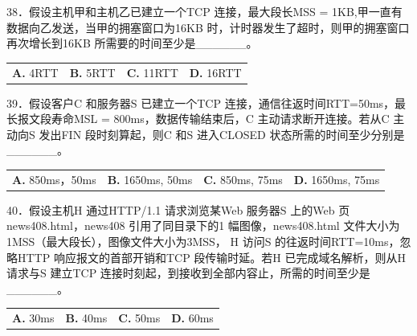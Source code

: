\documentclass[UTF8,11pt]{ctexart}
\begin{document}
38．假设主机甲和主机乙已建立一个TCP 连接，最大段长MSS = 1KB,甲一直有数据向乙发送，当甲的拥塞窗口为16KB 时，计时器发生了超时，则甲的拥塞窗口再次增长到16KB 所需要的时间至少是\_\_\_\_\_\_。


\begin{center}\begin{tabular}{>{\raggedright\arraybackslash}p{\dimexpr(\linewidth-8\tabcolsep)/4\relax}>{\raggedright\arraybackslash}p{\dimexpr(\linewidth-8\tabcolsep)/4\relax}>{\raggedright\arraybackslash}p{\dimexpr(\linewidth-8\tabcolsep)/4\relax}>{\raggedright\arraybackslash}p{\dimexpr(\linewidth-8\tabcolsep)/4\relax}}
\textbf{A.} 4RTT & \textbf{B.} 5RTT & \textbf{C.} 11RTT & \textbf{D.} 16RTT\\[.35em]\end{tabular}\end{center}

39．假设客户C 和服务器S 已建立一个TCP 连接，通信往返时间RTT=50ms，最长报文段寿命MSL = 800ms，数据传输结束后，C 主动请求断开连接。若从C 主动向S 发出FIN 段时刻算起，则C 和S 进入CLOSED 状态所需的时间至少分别是\_\_\_\_\_\_。


\begin{center}\begin{tabular}{>{\raggedright\arraybackslash}p{\dimexpr(\linewidth-8\tabcolsep)/4\relax}>{\raggedright\arraybackslash}p{\dimexpr(\linewidth-8\tabcolsep)/4\relax}>{\raggedright\arraybackslash}p{\dimexpr(\linewidth-8\tabcolsep)/4\relax}>{\raggedright\arraybackslash}p{\dimexpr(\linewidth-8\tabcolsep)/4\relax}}
\textbf{A.} 850ms，50ms & \textbf{B.} 1650ms, 50ms & \textbf{C.} 850ms, 75ms & \textbf{D.} 1650ms, 75ms\\[.35em]\end{tabular}\end{center}

40．假设主机H 通过HTTP/1.1 请求浏览某Web 服务器S 上的Web 页news408.html，news408 引用了同目录下的1 幅图像，news408.html 文件大小为1MSS（最大段长），图像文件大小为3MSS， H 访问S 的往返时间RTT=10ms，忽略HTTP 响应报文的首部开销和TCP 段传输时延。若H 已完成域名解析，则从H 请求与S 建立TCP 连接时刻起，到接收到全部内容止，所需的时间至少是\_\_\_\_\_\_。


\begin{center}\begin{tabular}{>{\raggedright\arraybackslash}p{\dimexpr(\linewidth-8\tabcolsep)/4\relax}>{\raggedright\arraybackslash}p{\dimexpr(\linewidth-8\tabcolsep)/4\relax}>{\raggedright\arraybackslash}p{\dimexpr(\linewidth-8\tabcolsep)/4\relax}>{\raggedright\arraybackslash}p{\dimexpr(\linewidth-8\tabcolsep)/4\relax}}
\textbf{A.} 30ms & \textbf{B.} 40ms & \textbf{C.} 50ms & \textbf{D.} 60ms\\[.35em]\end{tabular}\end{center}
\end{document}
